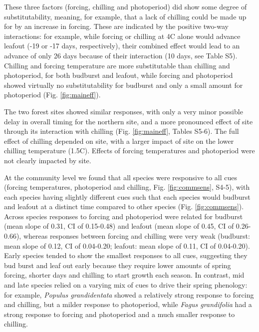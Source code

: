 \documentclass[11pt]{article}
\begin{document}
These three factors (forcing, chilling and photoperiod) did show some degree of substitutability, meaning, for example, that a lack of chilling could be made up for by an increase in forcing. These are indicated by the positive two-way interactions: for example, while forcing or chilling at 4\degree C alone would advance leafout (-19 or -17 days, respectively), their combined effect would lead to an advance of only 26 days because of their interaction (10 days, see Table S5). Chilling and forcing temperature are more substitutable than chilling and photoperiod, for both budburst and leafout, while forcing and photoperiod showed virtually no substitutability for budburst and only a small amount for photoperiod (Fig. \ref{fig:maineff}).

The two forest sites showed similar responses, with only a very minor possible delay in overall timing for the northern site, and a more pronounced effect of site through its interaction with chilling (Fig. \ref{fig:maineff}, Tables S5-6). The full effect of chilling depended on site, with a larger impact of site on the lower chilling temperature (1.5\degree C). Effects of forcing temperatures and photoperiod were not clearly impacted by site. 

At the community level we found that all species were responsive to all cues (forcing temperatures, photoperiod and chilling, Fig. \ref{fig:commsens}, S4-5), with each species having slightly different cues such that each species would budburst and leafout at a distinct time compared to other species (Fig. \ref{fig:commsens}). Across species responses to forcing and photoperiod were related for budburst (mean slope of 0.31, CI of 0.15-0.48) and leafout (mean slope of 0.45, CI of 0.26-0.66), whereas responses between forcing and chilling were very weak (budburst: mean slope of 0.12, CI of 0.04-0.20; leafout: mean slope of 0.11, CI of 0.04-0.20). Early species tended to show the smallest responses to all cues, suggesting they bud burst and leaf out early because they require lower amounts of spring forcing, shorter days and chilling to start growth each season. In contrast, mid and late species relied on a varying mix of cues to drive their spring phenology: for example, \emph{Populus grandidentata} showed a relatively strong response to forcing and chilling, but a milder response to photoperiod, while \emph{Fagus grandifolia} had a strong response to forcing and photoperiod and a much smaller response to chilling.
\end{document}
